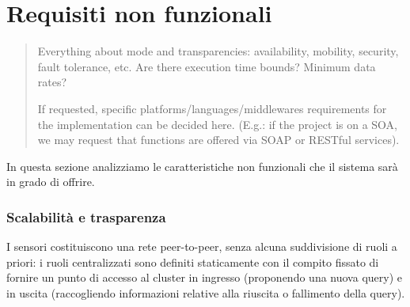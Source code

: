 \documentclass{llncs}
\begin{document}
%

\section{Requisiti non funzionali}
\label{sec:nonfunc-req}
\begin{quote}
  Everything about mode and transparencies:
  availability, mobility, security, fault tolerance, etc.
  Are there execution time bounds? Minimum data rates?

  If requested, specific platforms/languages/middlewares requirements
  for the implementation can be decided here.
  (E.g.: if the project is on a SOA, we may request that functions
  are offered via SOAP or RESTful services).
\end{quote}

In questa sezione analizziamo le caratteristiche non funzionali
che il sistema sarà in grado di offrire.

\subsubsection*{Scalabilità e trasparenza}
I sensori costituiscono una rete peer-to-peer,
senza alcuna suddivisione di ruoli a priori: i ruoli centralizzati
sono definiti staticamente con il compito fissato di fornire un punto
di accesso al cluster in ingresso (proponendo una nuova query) e
in uscita (raccogliendo informazioni relative alla riuscita
o fallimento della query).
\end{document}
